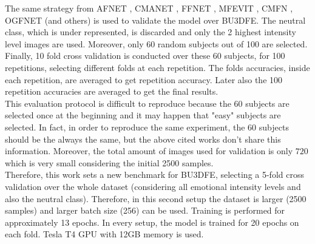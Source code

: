 The same strategy from AFNET \cite{RW_8A_AFNET}, CMANET \cite{RW_8B_CMANET}, FFNET \cite{RW_8C_FFNET}, MFEVIT \cite{RW_8D_MFEVIT}, CMFN \cite{RW_9_CMFN}, OGFNET \cite{RW_10_OGFNET} (and others) is used to validate the model over BU3DFE. The neutral class, which is under represented, is discarded and only the 2 highest intensity level images are used. Moreover, only 60 random subjects out of 100 are selected. Finally, 10 fold cross validation is conducted over these 60 subjects, for 100 repetitions, selecting different folds at each repetition. The folds accuracies, inside each repetition, are averaged to get repetition accuracy. Later also the 100 repetition accuracies are averaged to get the final results. \\
This evaluation protocol is difficult to reproduce because the 60 subjects are selected once at the beginning and it may happen that "easy" subjects are selected. In fact, in order to reproduce the same experiment, the 60 subjects should be the always the same, but the above cited works don't share this information. Moreover, the total amount of images used for validation is only $720$ which is very small considering the initial 2500 samples.\\

Therefore, this work sets a new benchmark for BU3DFE, selecting a 5-fold cross validation over the whole dataset (considering all emotional intensity levels and also the neutral class). Therefore, in this second setup the dataset is larger (2500 samples) and larger batch size (256) can be used. Training is performed for approximately 13 epochs.
In every setup, the model is trained for 20 epochs on each fold. Tesla T4 GPU with 12GB memory is used. 


